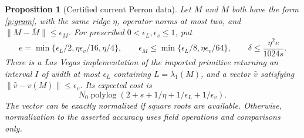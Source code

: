 \documentclass[11pt]{amsart}
\newtheorem{proposition}[theorem]{Proposition}
\theoremstyle{definition}\newtheorem{definition}[theorem]{Definition}
\theoremstyle{remark}\newtheorem{remark}[theorem]{Remark}
\numberwithin{equation}{section}
\begin{document}
\begin{proposition}[Certified current Perron data]\label{p:certificate}
Let $M$ and $\overline M$ both have the form \eqref{p:gram}, with the same
ridge $\eta$, operator norms at most two, and
$\|M-\overline M\|\le\epsilon_M$.  For prescribed
$0<\epsilon_L,\epsilon_v\le1$, put
\begin{equation}\label{p:budgets}
 e=\min\{\epsilon_L/2,\eta\epsilon_v/16,\eta/4\},\qquad
 \epsilon_M\le\min\{\epsilon_L/8,\eta\epsilon_v/64\},\qquad
 \delta\le\frac{\eta^2e}{1024s}.
\end{equation}
There is a Las Vegas implementation of the imported primitive returning
an interval $I$ of width at most $\epsilon_L$ containing
$L=\lambda_1(M)$, and a vector $\widehat v$ satisfying
$\|\widehat v-v(M)\|\le\epsilon_v$.  Its expected cost is
\[
 N_0\operatorname{polylog}(2+s+1/\eta+1/\epsilon_L+1/\epsilon_v).
\]
The vector can be exactly normalized if square roots are available.
Otherwise, normalization to the asserted accuracy uses field operations
and comparisons only.
\end{proposition}
\end{document}
